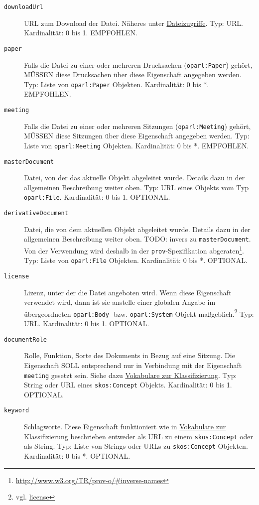 \documentclass[,a4paper]{article}
\begin{document}
\begin{description}
\item[\texttt{downloadUrl}]
URL zum Download der Datei. Näheres unter
\hyperref[dateizugriff]{Dateizugriffe}. Typ: URL. Kardinalität: 0 bis 1.
EMPFOHLEN.
\item[\texttt{paper}]
Falls die Datei zu einer oder mehreren Drucksachen
(\texttt{oparl:Paper}) gehört, MÜSSEN diese Drucksachen über diese
Eigenschaft angegeben werden. Typ: Liste von \texttt{oparl:Paper}
Objekten. Kardinalität: 0 bis *. EMPFOHLEN.
\item[\texttt{meeting}]
Falls die Datei zu einer oder mehreren Sitzungen
(\texttt{oparl:Meeting}) gehört, MÜSSEN diese Sitzungen über diese
Eigenschaft angegeben werden. Typ: Liste von \texttt{oparl:Meeting}
Objekten. Kardinalität: 0 bis *. EMPFOHLEN.
\item[\texttt{masterDocument}]
Datei, von der das aktuelle Objekt abgeleitet wurde. Details dazu in der
allgemeinen Beschreibung weiter oben. Typ: URL eines Objekts vom Typ
\texttt{oparl:File}. Kardinalität: 0 bis 1. OPTIONAL.
\item[\texttt{derivativeDocument}]
Datei, die von dem aktuellen Objekt abgeleitet wurde. Details dazu in
der allgemeinen Beschreibung weiter oben. TODO: invers zu
\texttt{masterDocument}. Von der Verwendung wird deshalb in der
\texttt{prov}-Spezifikation abgeraten\footnote{\url{http://www.w3.org/TR/prov-o/\#inverse-names}}.
Typ: Liste von \texttt{oparl:File} Objekten. Kardinalität: 0 bis *.
OPTIONAL.
\item[\texttt{license}]
Lizenz, unter der die Datei angeboten wird. Wenn diese Eigenschaft
verwendet wird, dann ist sie anstelle einer globalen Angabe im
übergeordneten \texttt{oparl:Body}- bzw. \texttt{oparl:System}-Objekt
maßgeblich.\footnote{vgl. \hyperref[eigenschaftux5flicense]{license}}
Typ: URL. Kardinalität: 0 bis 1. OPTIONAL.
\item[\texttt{documentRole}]
Rolle, Funktion, Sorte des Dokuments in Bezug auf eine Sitzung. Die
Eigenschaft SOLL entsprechend nur in Verbindung mit der Eigenschaft
\texttt{meeting} gesetzt sein. Siehe dazu
\hyperref[vokabulareux5fklassifizierung]{Vokabulare zur
Klassifizierung}. Typ: String oder URL eines \texttt{skos:Concept}
Objekts. Kardinalität: 0 bis 1. OPTIONAL.
\item[\texttt{keyword}]
Schlagworte. Diese Eigenschaft funktioniert wie in
\hyperref[vokabulareux5fklassifizierung]{Vokabulare zur Klassifizierung}
beschrieben entweder als URL zu einem \texttt{skos:Concept} oder als
String. Typ: Liste von Strings oder URLs zu \texttt{skos:Concept}
Objekten. Kardinalität: 0 bis *. OPTIONAL.
\end{description}
\end{document}
